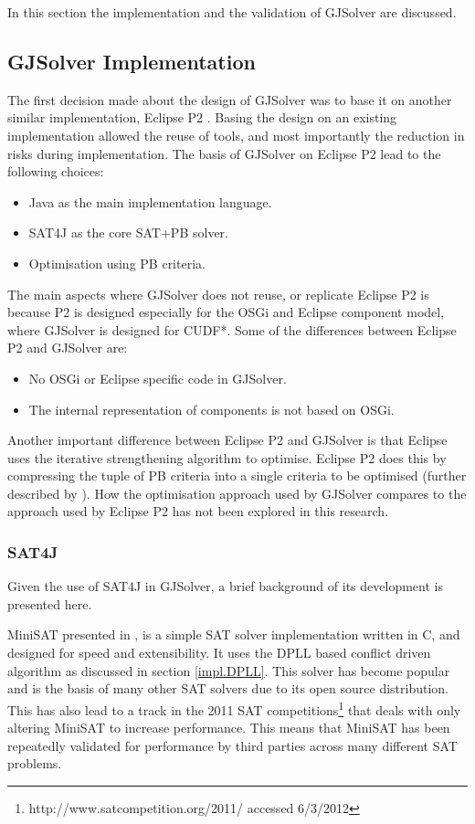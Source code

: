 In this section the implementation and the validation of GJSolver are discussed.

\subsection{GJSolver Implementation}
\label{impl.gjsolverimpl}
The first decision made about the design of GJSolver was to base it on another similar implementation, Eclipse P2 \citep{le_berre_dependency_2009,leBerre2010}.
Basing the design on an existing implementation allowed the reuse of tools, and most importantly the reduction in risks during implementation.
The basis of GJSolver on Eclipse P2 lead to the following choices:
\begin{itemize}
  \item Java as the main implementation language.
  \item SAT4J as the core SAT+PB solver.
  \item Optimisation using PB criteria.
\end{itemize}

The main aspects where GJSolver does not reuse, or replicate Eclipse P2 is because P2 is designed especially for the OSGi and Eclipse component model, where GJSolver is designed for CUDF*.
Some of the differences between Eclipse P2 and GJSolver are:
\begin{itemize}
  \item No OSGi or Eclipse specific code in GJSolver.
  \item The internal representation of components is not based on OSGi.
\end{itemize}

Another important difference between Eclipse P2 and GJSolver is that Eclipse uses the iterative strengthening algorithm to optimise.
Eclipse P2 does this by compressing the tuple of PB criteria into a single criteria to be optimised (further described by \cite{leBerre2010}).  
How the optimisation approach used by GJSolver compares to the approach used by Eclipse P2 has not been explored in this research.

\subsubsection{SAT4J}
Given the use of SAT4J in GJSolver, a brief background of its development is presented here.

MiniSAT presented in \citep{een2003}, is a simple SAT solver implementation written in C, and designed for speed and extensibility.
It uses the DPLL based conflict driven algorithm as discussed in section \ref{impl.DPLL}.
This solver has become popular and is the basis of many other SAT solvers due to its open source distribution.
This has also lead to a track in the 2011 SAT competitions\footnote{http://www.satcompetition.org/2011/ accessed 6/3/2012} that deals with only altering MiniSAT to increase performance.
This means that MiniSAT has been repeatedly validated for performance by third parties across many different SAT problems. 

